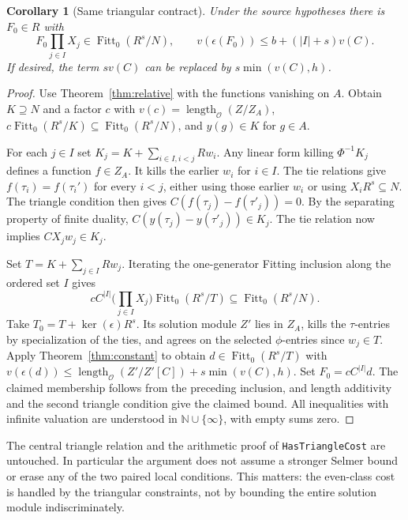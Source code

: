 \documentclass[11pt]{article}
\newtheorem{corollary}[theorem]{Corollary}
\theoremstyle{remark}\newtheorem{remark}[theorem]{Remark}
\newcommand{\Ocal}{\mathcal O}
\newcommand{\Fitt}{\operatorname{Fitt}_0}
\newcommand{\len}{\operatorname{length}_{\Ocal}}
\begin{document}
\begin{corollary}[Same triangular contract]\label{cor:triangle}
Under the source hypotheses there is $F_0\in R$ with
\[
 F_0\prod_{j\in I}X_j\in\Fitt(R^s/N),\qquad
 v(\epsilon(F_0))\le b+(|I|+s)v(C).
\]
If desired, the term $s v(C)$ can be replaced by $s\min(v(C),h)$.
\end{corollary}
\begin{proof}
Use Theorem~\ref{thm:relative} with the functions vanishing on $A$. Obtain $K\supseteq N$ and a factor $c$ with $v(c)=\len(Z/Z_A)$, $c\Fitt(R^s/K)\subseteq\Fitt(R^s/N)$, and $y(g)\in K$ for $g\in A$.

For each $j\in I$ set $K_j=K+\sum_{i\in I,i<j}Rw_i$. Any linear form killing $\Phi^{-1}K_j$ defines a function $f\in Z_A$. It kills the earlier $w_i$ for $i\in I$. The tie relations give $f(\tau_i)=f(\tau_i')$ for every $i<j$, either using those earlier $w_i$ or using $X_iR^s\subseteq N$. The triangle condition then gives $C(f(\tau_j)-f(\tau'_j))=0$. By the separating property of finite duality, $C(y(\tau_j)-y(\tau'_j))\in K_j$. The tie relation now implies $CX_j w_j\in K_j$.

Set $T=K+\sum_{j\in I}Rw_j$. Iterating the one-generator Fitting inclusion along the ordered set $I$ gives
\[
 cC^{|I|}\Big(\prod_{j\in I}X_j\Big)\Fitt(R^s/T)\subseteq\Fitt(R^s/N).
\]
Take $T_0=T+\ker(\epsilon)R^s$. Its solution module $Z'$ lies in $Z_A$, kills the $\tau$-entries by specialization of the ties, and agrees on the selected $\phi$-entries since $w_j\in T$. Apply Theorem~\ref{thm:constant} to obtain $d\in\Fitt(R^s/T)$ with $v(\epsilon(d))\le\len(Z'/Z'[C])+s\min(v(C),h)$. Set $F_0=cC^{|I|}d$. The claimed membership follows from the preceding inclusion, and length additivity and the second triangle condition give the claimed bound. All inequalities with infinite valuation are understood in $\mathbb N\cup\{\infty\}$, with empty sums zero.
\end{proof}
The central triangle relation and the arithmetic proof of \texttt{HasTriangleCost} are untouched. In particular the argument does not assume a stronger Selmer bound or erase any of the two paired local conditions. This matters: the even-class cost is handled by the triangular constraints, not by bounding the entire solution module indiscriminately.
\end{document}
